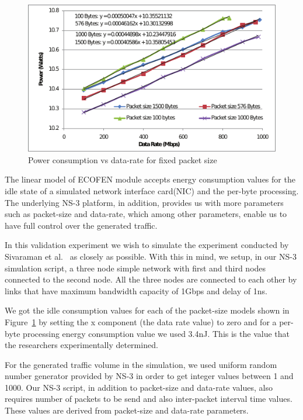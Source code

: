 \begin{figure}[ht]
	\begin{center}
		\includegraphics{images/powervsdatarate1.pdf}
		\caption{Power consumption vs data-rate for fixed packet size \cite{Sivaraman}}
		\label{fig:powervsdatarate1}
	\end{center}
\end{figure}

The linear model of ECOFEN module accepts energy consumption values for the idle state of a simulated network interface card(NIC) and the per-byte processing. The underlying NS-3 platform, in addition, provides us with more parameters such as packet-size and data-rate, which among other parameters, enable us to have full control over the generated traffic.

In this validation experiment we wish to simulate the experiment conducted by Sivaraman et al.{\ } as closely as possible. With this in mind, we setup, in our NS-3 simulation script, a three node simple network with first and third nodes connected to the second node. All the three nodes are connected to each other by links that have maximum bandwidth capacity of 1Gbps and delay of 1ns. 


We got the idle consumption values for each of the packet-size models shown in Figure~\ref{fig:powervsdatarate1} by setting the x component (the data rate value) to zero and for a per-byte processing energy consumption value we used 3.4nJ. This is the value that the researchers experimentally determined. 

For the generated traffic volume in the simulation, we used uniform random number generator provided by NS-3 in order to get integer values between 1 and 1000. Our NS-3 script, in addition to packet-size and data-rate values, also requires number of packets to be send and also inter-packet interval time values. These values are derived from packet-size and data-rate parameters. 

